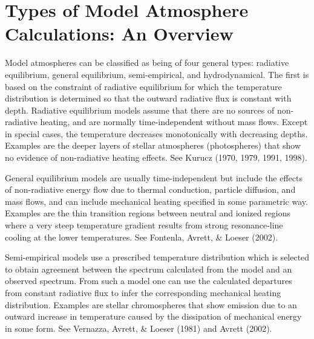 \documentclass[11pt,twoside]{article}
\begin{document}
\section{Types of Model Atmosphere Calculations: An Overview}

Model atmospheres can be classified as being of four general types: 
radiative equilibrium, general equilibrium, semi-empirical, and 
hydrodynamical.  The first is based on the constraint of radiative 
equilibrium for which the temperature distribution is determined so that 
the outward radiative flux is constant with depth.  Radiative equilibrium 
models assume that there are no sources of non-radiative heating, and are 
normally time-independent without mass flows.  Except in special cases, 
the temperature decreases monotonically with decreasing depths.  Examples 
are the deeper layers of stellar atmospheres (photospheres) that show no 
evidence of non-radiative heating effects.  See Kurucz (1970, 1979, 
1991, 1998).

General equilibrium models are usually time-independent but include the
effects of non-radiative energy flow due to thermal conduction, particle
diffusion, and mass flows, and can include mechanical heating specified
in some parametric way.  Examples are the thin transition regions between
neutral and ionized regions where a very steep temperature gradient 
results from strong resonance-line cooling at the lower temperatures.  
See Fontenla, Avrett, \& Loeser (2002).

Semi-empirical models use a prescribed temperature distribution which is
selected to obtain agreement between the spectrum calculated from the model
and an observed spectrum.  From such a model one can use the calculated
departures from constant radiative flux to infer the corresponding
mechanical heating distribution.  Examples are stellar
chromospheres that show emission due to an outward increase in temperature
caused by the dissipation of mechanical energy in some form.  See
Vernazza, Avrett, \& Loeser (1981) and Avrett (2002).
\end{document}
